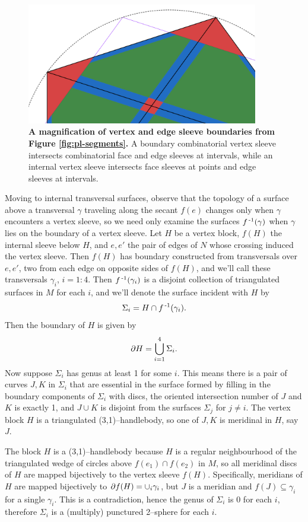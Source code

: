 \begin{figure}[h!]
	\centering
	\includegraphics[width=0.9\textwidth]{figures/pl-segments-zoom.png}
	\caption{
		\textbf{A magnification of vertex and edge sleeve boundaries from Figure \ref{fig:pl-segments}.}
		A boundary combinatorial vertex sleeve intersects combinatorial face and edge sleeves at intervals, while an internal vertex sleeve intersects face sleeves at points and edge sleeves at intervals.
	}
	\label{fig:pl-segments-zoom}
\end{figure}

Moving to internal transversal surfaces, observe that the topology of a surface above a transversal $\gamma$ traveling along the secant $f(e)$ changes only when $\gamma$ encounters a vertex sleeve, so we need only examine the surfaces $f^{\,\text{-}1}(\gamma)$ when $\gamma$ lies on the boundary of a vertex sleeve.
Let $H$ be a vertex block, $f(H)$ the internal sleeve below $H$, and $e,e'$ the pair of edges of $N$ whose crossing induced the vertex sleeve.
Then $f(H)$ has boundary constructed from transversals over $e,e'$, two from each edge on opposite sides of $f(H)$, and we'll call these transversals $\gamma_i$, $i=1:4$.
Then $f^{\,\text{-}1}(\gamma_i)$ is a disjoint collection of triangulated surfaces in $M$ for each $i$, and we'll denote the surface incident with $H$ by
\[
	\Sigma_i = H\cap f^{\,\text{-}1}(\gamma_i).
\]
Then the boundary of $H$ is given by
\[
	\partial H = \bigcup_{i=1}^4 \Sigma_i.
\]
Now suppose $\Sigma_i$ has genus at least 1 for some $i$.
This means there is a pair of curves $J,K$ in $\Sigma_i$ that are essential in the surface formed by filling in the boundary components of $\Sigma_i$ with discs, the oriented intersection number of $J$ and $K$ is exactly 1, and $J\cup K$ is disjoint from the surfaces $\Sigma_j$ for $j\neq i$.
The vertex block $H$ is a triangulated (3,1)--handlebody, so one of $J,K$ is meridinal in $H$, say $J$.

The block $H$ is a (3,1)--handlebody because $H$ is a regular neighbourhood of the triangulated wedge of circles above $f(e_1)\cap f(e_2)$ in $M$, so all meridinal discs of $H$ are mapped bijectively to the vertex sleeve $f(H)$.
Specifically, meridians of $H$ are mapped bijectively to $\partial f(H) = \cup_i\gamma_i$, but $J$ is a meridian and $f(J)\subseteq \gamma_i$ for a single $\gamma_i$.
This is a contradiction, hence the genus of $\Sigma_i$ is 0 for each $i$, therefore $\Sigma_i$ is a (multiply) punctured 2--sphere for each $i$.

